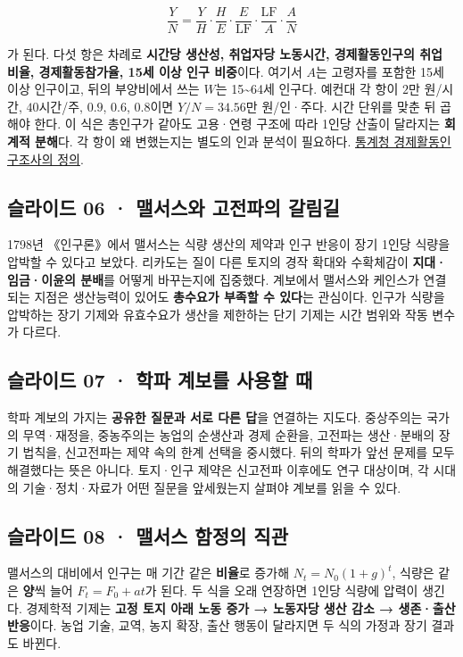 \documentclass[10pt,a4paper]{article}
\begin{document}
\[
\frac{Y}{N}=\frac{Y}{H}\cdot\frac{H}{E}\cdot\frac{E}{\mathrm{LF}}\cdot\frac{\mathrm{LF}}{A}\cdot\frac{A}{N}
\]

가 된다. 다섯 항은 차례로 \textbf{시간당 생산성, 취업자당 노동시간, 경제활동인구의 취업 비율, 경제활동참가율, 15세 이상 인구 비중}이다. 여기서 $A$는 고령자를 포함한 15세 이상 인구이고, 뒤의 부양비에서 쓰는 $W$는 15\textasciitilde{}64세 인구다. 예컨대 각 항이 $2$만 원/시간, $40$시간/주, $0.9$, $0.6$, $0.8$이면 $Y/N=34.56$만 원/인·주다. 시간 단위를 맞춘 뒤 곱해야 한다. 이 식은 총인구가 같아도 고용·연령 구조에 따라 1인당 산출이 달라지는 \textbf{회계적 분해}다. 각 항이 왜 변했는지는 별도의 인과 분석이 필요하다. \href{https://kostat.go.kr/boardDownload.es?bid=5106\&list\_no=434796\&seq=2}{통계청 경제활동인구조사의 정의}.\par

\subsection{슬라이드 06 · 맬서스와 고전파의 갈림길}
1798년 《인구론》에서 맬서스는 식량 생산의 제약과 인구 반응이 장기 1인당 식량을 압박할 수 있다고 보았다. 리카도는 질이 다른 토지의 경작 확대와 수확체감이 \textbf{지대·임금·이윤의 분배}를 어떻게 바꾸는지에 집중했다. 계보에서 맬서스와 케인스가 연결되는 지점은 생산능력이 있어도 \textbf{총수요가 부족할 수 있다}는 관심이다. 인구가 식량을 압박하는 장기 기제와 유효수요가 생산을 제한하는 단기 기제는 시간 범위와 작동 변수가 다르다.\par

\subsection{슬라이드 07 · 학파 계보를 사용할 때}
학파 계보의 가지는 \textbf{공유한 질문과 서로 다른 답}을 연결하는 지도다. 중상주의는 국가의 무역·재정을, 중농주의는 농업의 순생산과 경제 순환을, 고전파는 생산·분배의 장기 법칙을, 신고전파는 제약 속의 한계 선택을 중시했다. 뒤의 학파가 앞선 문제를 모두 해결했다는 뜻은 아니다. 토지·인구 제약은 신고전파 이후에도 연구 대상이며, 각 시대의 기술·정치·자료가 어떤 질문을 앞세웠는지 살펴야 계보를 읽을 수 있다.\par

\subsection{슬라이드 08 · 맬서스 함정의 직관}
맬서스의 대비에서 인구는 매 기간 같은 \textbf{비율}로 증가해 $N_t=N_0(1+g)^t$, 식량은 같은 \textbf{양}씩 늘어 $F_t=F_0+at$가 된다. 두 식을 오래 연장하면 1인당 식량에 압력이 생긴다. 경제학적 기제는 \textbf{고정 토지 아래 노동 증가 → 노동자당 생산 감소 → 생존·출산 반응}이다. 농업 기술, 교역, 농지 확장, 출산 행동이 달라지면 두 식의 가정과 장기 결과도 바뀐다.\par
\end{document}
